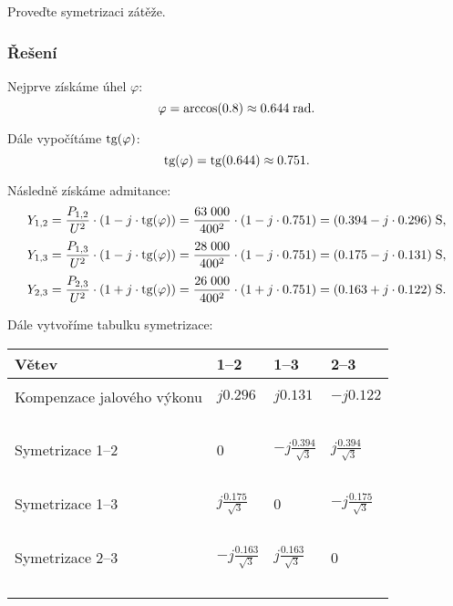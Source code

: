 \documentclass{article}
\begin{document}
Proveďte symetrizaci zátěže.

\subsubsection{Řešení}
Nejprve získáme úhel $\varphi$:
$$
    \varphi = \textrm{arccos} (0.8) \approx 0.644 \; \textrm{rad}.
$$

Dále vypočítáme $\textrm{tg} (\varphi)$:
$$
    \textrm{tg} (\varphi) = \textrm{tg} (0.644) \approx 0.751.
$$

Následně získáme admitance:
$$
    Y_{1,2} = \frac{P_{1,2}}{U^2} \cdot (1 - j \cdot \textrm{tg} (\varphi)) = \frac{63 \; 000}{400^2} \cdot (1 - j \cdot 0.751) = (0.394 - j \cdot 0.296) \; \textrm{S},
$$
$$
    Y_{1,3} = \frac{P_{1,3}}{U^2} \cdot (1 - j \cdot \textrm{tg} (\varphi)) = \frac{28 \; 000}{400^2} \cdot (1 - j \cdot 0.751) = (0.175 - j \cdot 0.131) \; \textrm{S},
$$
$$
    Y_{2,3} = \frac{P_{2,3}}{U^2} \cdot (1 + j \cdot \textrm{tg} (\varphi)) = \frac{26 \; 000}{400^2} \cdot (1 + j \cdot 0.751) = (0.163 + j \cdot 0.122) \; \textrm{S}.
$$

Dále vytvoříme tabulku symetrizace:
\begin{table}[H]
    \centering
    \begin{tabular}{l l l l}
        \hline
        Větev                      & 1--2                        & 1--3                        & 2--3                        \\
        \hline                                                                                                               \\
        Kompenzace jalového výkonu & $j 0.296$                   & $j 0.131$                   & $-j 0.122$                  \\~\\
        Symetrizace 1--2           & 0                           & $-j \frac{0.394}{\sqrt{3}}$ & $j \frac{0.394}{\sqrt{3}}$  \\~\\
        Symetrizace 1--3           & $j \frac{0.175}{\sqrt{3}}$  & 0                           & $-j \frac{0.175}{\sqrt{3}}$ \\~\\
        Symetrizace 2--3           & $-j \frac{0.163}{\sqrt{3}}$ & $j \frac{0.163}{\sqrt{3}}$  & 0                           \\~\\
        \hline
    \end{tabular}
\end{table}
\end{document}
